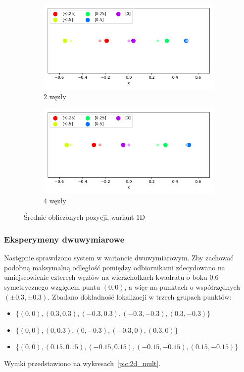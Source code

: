\begin{figure}[H]
\centering
\begin{subfigure}{.5\textwidth}
    \centering
    \includegraphics[width=\linewidth]{pics/mult_lat_1d/positions_2_mean.png}
\caption{2 węzły}
\label{pic:1d_2_mult}
\end{subfigure}%
\begin{subfigure}{.5\textwidth}
    \centering
    \includegraphics[width=\linewidth]{pics/mult_lat_1d/positions_4_mean.png}
    \caption{4 węzły}
\label{pic:1d_4_mult}
\end{subfigure}
\caption{Średnie obliczonych pozycji, wariant 1D}
\label{pic:1d_mult}
\end{figure}

\subsubsection{Eksperymeny dwuwymiarowe}

Następnie sprawdzono system w wariancie dwuwymiarowym. Zby zachować podobną maksymalną odległość pomiędzy odbiornikami zdecydowano na umiejscowienie czterech węzłów na wierzchołkach kwadratu o boku $0.6$ symetrycznego względem puntu $(0,0)$, a więc na punktach o współrzędnych $(\pm0.3, \pm0.3)$. Zbadano dokładność lokalizacji w trzech grupach punktów:
\begin{itemize}
    \item $\{(0,0), (0.3,0.3), (-0.3,0.3), (-0.3,-0.3), (0.3,-0.3)\}$
    \item $\{(0,0), (0,0.3), (0,-0.3), (-0.3,0), (0.3,0)\}$
    \item $\{(0,0), (0.15,0.15), (-0.15,0.15), (-0.15,-0.15), (0.15,-0.15)\}$
\end{itemize}
Wyniki przedstawiono na wykresach~\ref{pic:2d_mult}.

